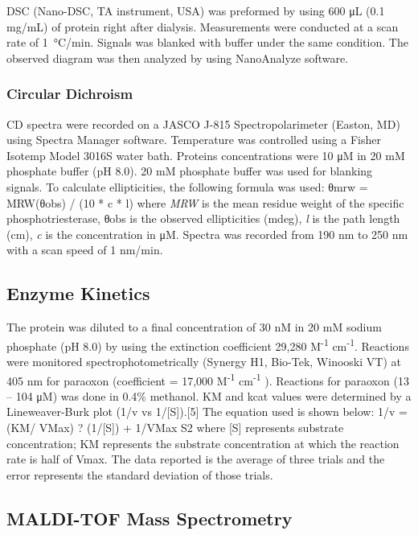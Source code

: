 \begin{refsection}
DSC (Nano-DSC, TA instrument, USA) was preformed by using 600 μL (0.1 mg/mL) of
protein right after dialysis. Measurements were conducted at a scan rate of
\SI{1}{\celsius}/min. Signals was blanked with buffer under the same condition.
The observed diagram was then analyzed by using NanoAnalyze software.

\subsubsection{Circular Dichroism}

CD spectra were recorded on a JASCO J-815 Spectropolarimeter (Easton, MD) using
Spectra Manager software. Temperature was controlled using a Fisher Isotemp
Model 3016S water bath. Proteins concentrations were 10 μM in 20 mM phosphate
buffer (pH 8.0). 20 mM phosphate buffer was used for blanking signals. To
calculate ellipticities, the following formula was used:
θmrw = MRW(θobs) / (10 * c * l)
where \emph{MRW} is the mean residue weight of the specific phosphotriesterase, θobs
is the observed ellipticities (mdeg), \emph{l} is the path length (cm), \emph{c} is the
concentration in μM. Spectra was recorded from 190 nm to 250 nm with a scan
speed of 1 nm/min.

\subsection{Enzyme Kinetics}

The protein was diluted to a final concentration of 30 nM in 20 mM sodium
phosphate (pH 8.0) by using the extinction coefficient 29,280
M\textsuperscript{-1} cm\textsuperscript{-1}. Reactions were monitored
spectrophotometrically (Synergy H1, Bio-Tek, Winooski VT) at 405 nm for
paraoxon (coefficient = 17,000 M\textsuperscript{-1}  cm\textsuperscript{-1} ).
Reactions for paraoxon (13 – 104 μM) was done in 0.4\% methanol. KM and kcat
values were determined by a Lineweaver-Burk plot (1/v vs 1/[S]).[5] The
equation used is shown below: 
1/v = (KM/ VMax) ? (1/[S]) + 1/VMax S2
where [S] represents substrate concentration; KM represents the substrate
concentration at which the reaction rate is half of Vmax. The data reported is
the average of three trials and the error represents the standard deviation of
those trials.

\subsection{MALDI-TOF Mass Spectrometry}


\end{refsection}
